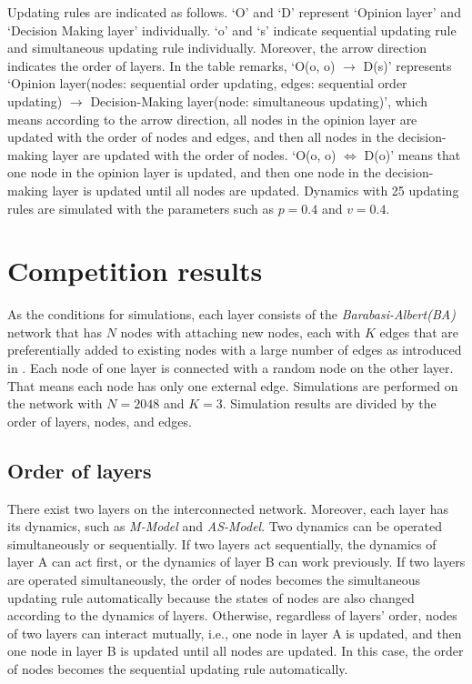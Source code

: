 Updating rules are indicated as follows. `O' and `D'  represent `Opinion layer' and `Decision Making layer' individually. `o' and `s' indicate sequential updating rule and simultaneous updating rule individually. Moreover, the arrow direction indicates the order of layers. In the table remarks, `O(o, o) $\to$ D(s)' represents `Opinion layer(nodes: sequential order updating, edges: sequential order updating) $\to$ Decision-Making layer(node: simultaneous updating)', which means according to the arrow direction, all nodes in the opinion layer are updated with the order of nodes and edges, and then all nodes in the decision-making layer are updated with the order of nodes. `O(o, o) $\Leftrightarrow$ D(o)' means that one node in the opinion layer is updated, and then one node in the decision-making layer is updated until all nodes are updated. Dynamics with 25 updating rules are simulated with the parameters such as $p=0.4$ and $v=0.4$. \\

\section{Competition results}
As the conditions for simulations, each layer consists of the \textit{Barabasi-Albert(BA)} network that has $N$ nodes with attaching new nodes, each with $K$ edges that are preferentially added to existing nodes with a large number of edges as introduced in \parencite{barabasi1999}. Each node of one layer is connected with a random node on the other layer. That means each node has only one external edge. Simulations are performed on the network with $N=2048$ and $K=3$. Simulation results are divided by the order of layers, nodes, and edges.\\

\subsection{Order of layers}
\label{order of layer}
There exist two layers on the interconnected network. Moreover, each layer has its dynamics, such as \textit{M-Model} and \textit{AS-Model}. Two dynamics can be operated simultaneously or sequentially. If two layers act sequentially, the dynamics of layer A can act first, or the dynamics of layer B can work previously. If two layers are operated simultaneously, the order of nodes becomes the simultaneous updating rule automatically because the states of nodes are also changed according to the dynamics of layers. Otherwise, regardless of layers' order, nodes of two layers can interact mutually, i.e., one node in layer A is updated, and then one node in layer B is updated until all nodes are updated. In this case, the order of nodes becomes the sequential updating rule automatically.

